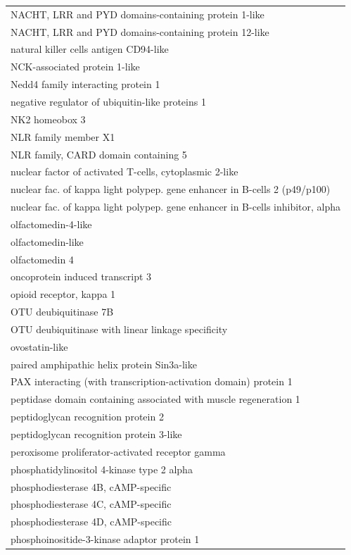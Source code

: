 \documentclass[english]{article}\usepackage[]{graphicx}\usepackage[]{color}
\begin{document}
\begin{longtable}{l}
NACHT, LRR and PYD domains-containing protein 1-like \\ 
NACHT, LRR and PYD domains-containing protein 12-like \\ 
natural killer cells antigen CD94-like \\ 
NCK-associated protein 1-like \\ 
Nedd4 family interacting protein 1 \\ 
negative regulator of ubiquitin-like proteins 1 \\ 
NK2 homeobox 3 \\ 
NLR family member X1 \\ 
NLR family, CARD domain containing 5 \\ 
nuclear factor of activated T-cells, cytoplasmic 2-like \\ 
nuclear fac. of kappa light polypep. gene enhancer in B-cells 2 (p49/p100) \\ 
nuclear fac. of kappa light polypep. gene enhancer in B-cells inhibitor, alpha \\ 
olfactomedin-4-like \\ 
olfactomedin-like \\ 
olfactomedin 4 \\ 
oncoprotein induced transcript 3 \\ 
opioid receptor, kappa 1 \\ 
OTU deubiquitinase 7B \\ 
OTU deubiquitinase with linear linkage specificity \\ 
ovostatin-like \\ 
paired amphipathic helix protein Sin3a-like \\ 
PAX interacting (with transcription-activation domain) protein 1 \\ 
peptidase domain containing associated with muscle regeneration 1 \\ 
peptidoglycan recognition protein 2 \\ 
peptidoglycan recognition protein 3-like \\ 
peroxisome proliferator-activated receptor gamma \\ 
phosphatidylinositol 4-kinase type 2 alpha \\ 
phosphodiesterase 4B, cAMP-specific \\ 
phosphodiesterase 4C, cAMP-specific \\ 
phosphodiesterase 4D, cAMP-specific \\ 
phosphoinositide-3-kinase adaptor protein 1 \\ 

\end{longtable}
\end{document}

